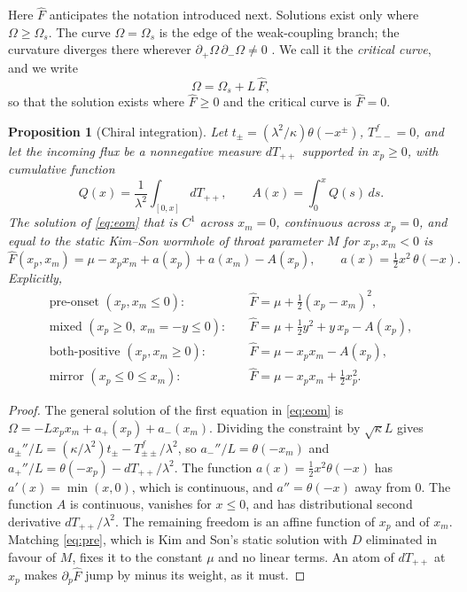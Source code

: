 \documentclass[11pt]{article}
\newtheorem{proposition}{Proposition}
\theoremstyle{remark}
\newcommand{\Fh}{\widehat F}
\begin{document}
Here $\Fh$ anticipates the notation introduced next. Solutions exist only where $\Omega\ge\Omega_s$. The curve $\Omega=\Omega_s$ is the edge of the weak-coupling branch; the curvature diverges there wherever $\partial_+\Omega\,\partial_-\Omega\neq0$ \cite{RST}. We call it the \emph{critical curve}, and we write
\[
\Omega=\Omega_s+L\,\Fh ,
\]
so that the solution exists where $\Fh\ge0$ and the critical curve is $\Fh=0$.

\begin{proposition}[Chiral integration]\label{prop:chiral}
Let $t_\pm=(\lambda^2/\kappa)\theta(-x^\pm)$, $T^f_{--}=0$, and let the incoming flux be a nonnegative measure $dT_{++}$ supported in $x_p\ge0$, with cumulative function
\[
Q(x)=\frac1{\lambda^2}\int_{[0,x]}dT_{++},\qquad A(x)=\int_0^xQ(s)\,ds .
\]
The solution of \eqref{eq:eom} that is $C^1$ across $x_m=0$, continuous across $x_p=0$, and equal to the static Kim--Son wormhole of throat parameter $M$ for $x_p,x_m<0$ is
\begin{equation}\label{eq:Fhat}
\Fh(x_p,x_m)=\mu-x_px_m+a(x_p)+a(x_m)-A(x_p),\qquad a(x)=\tfrac12x^2\,\theta(-x).
\end{equation}
Explicitly,
\begin{align}
\text{pre-onset }(x_p,x_m\le0):&\quad \Fh=\mu+\tfrac12(x_p-x_m)^2, \label{eq:pre}\\
\text{mixed }(x_p\ge0,\ x_m=-y\le0):&\quad \Fh=\mu+\tfrac12y^2+y\,x_p-A(x_p), \label{eq:mixed}\\
\text{both-positive }(x_p,x_m\ge0):&\quad \Fh=\mu-x_px_m-A(x_p), \label{eq:post}\\
\text{mirror }(x_p\le0\le x_m):&\quad \Fh=\mu-x_px_m+\tfrac12x_p^2 . \label{eq:mirror}
\end{align}
\end{proposition}
\begin{proof}
The general solution of the first equation in \eqref{eq:eom} is $\Omega=-Lx_px_m+a_+(x_p)+a_-(x_m)$. Dividing the constraint by $\sqrt\kappa L$ gives $a_\pm''/L=(\kappa/\lambda^2)t_\pm-T^f_{\pm\pm}/\lambda^2$, so $a_-''/L=\theta(-x_m)$ and $a_+''/L=\theta(-x_p)-dT_{++}/\lambda^2$. The function $a(x)=\tfrac12x^2\theta(-x)$ has $a'(x)=\min(x,0)$, which is continuous, and $a''=\theta(-x)$ away from $0$. The function $A$ is continuous, vanishes for $x\le0$, and has distributional second derivative $dT_{++}/\lambda^2$. The remaining freedom is an affine function of $x_p$ and of $x_m$. Matching \eqref{eq:pre}, which is Kim and Son's static solution with $D$ eliminated in favour of $M$, fixes it to the constant $\mu$ and no linear terms. An atom of $dT_{++}$ at $x_p$ makes $\partial_p\Fh$ jump by minus its weight, as it must.
\end{proof}
\end{document}
